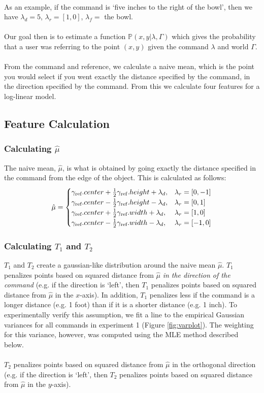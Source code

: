 \documentclass[12pt,letterpaper]{article}
\newcommand\refobj{\textmd{ref}}
\begin{document}
\\
As an example, if the command is `five inches to the right of the bowl', then we have $\lambda_d = 5$, $\lambda_r = [1, 0]$, $\lambda_f = $ the bowl. \\
\\
Our goal then is to estimate a function $\mathbb{P}(x, y | \lambda, \Gamma)$ which gives the probability that a user was referring to the point $(x, y)$ given the command $\lambda$ and world $\Gamma$. \\
\\
From the command and reference, we calculate a naive mean, which is the point you would select if you went exactly the distance specified by the command, in the direction specified by the command. From this we calculate four features for a log-linear model. 

\subsection{Feature Calculation}
\subsubsection{Calculating $\hat{\mu}$}
The naive mean, $\hat{\mu}$, is what is obtained by going exactly the distance specified in the command from the edge of the object. This is calculated as follows:
\[
\hat{\mu} = \begin{cases} 
\gamma_\refobj.center + \frac{1}{2}\gamma_\refobj.height + \lambda_d, & \lambda_r = [0, -1] \\
\gamma_\refobj.center - \frac{1}{2}\gamma_\refobj.height - \lambda_d, & \lambda_r = [0, 1] \\
\gamma_\refobj.center + \frac{1}{2}\gamma_\refobj.width + \lambda_d, & \lambda_r = [1, 0] \\
\gamma_\refobj.center - \frac{1}{2}\gamma_\refobj.width - \lambda_d, & \lambda_r = [-1, 0] 
\end{cases}
\]

\subsubsection{Calculating $T_1$ and $T_2$}
$T_1$ and $T_2$ create a gaussian-like distribution around the naive mean $\hat{\mu}$. $T_1$ penalizes points based on squared distance from $\hat{\mu}$ \emph{in the direction of the command} (e.g. if the direction is `left', then $T_1$ penalizes points based on squared distance from $\hat{\mu}$ in the $x$-axis). In addition, $T_1$ penalizes less if the command is a longer distance (e.g. 1 foot) than if it is a shorter distance (e.g. 1 inch). To experimentally verify this assumption, we fit a line to the empirical Gaussian variances for all commands in experiment 1 (Figure \ref{fig:varplot}). The weighting for this variance, however, was computed using the MLE method described below. \\
\\
$T_2$ penalizes points based on squared distance from $\hat{\mu}$ in the orthogonal direction (e.g. if the direction is `left', then $T_2$ penalizes points based on squared distance from $\hat{\mu}$ in the $y$-axis). \\
\end{document}
